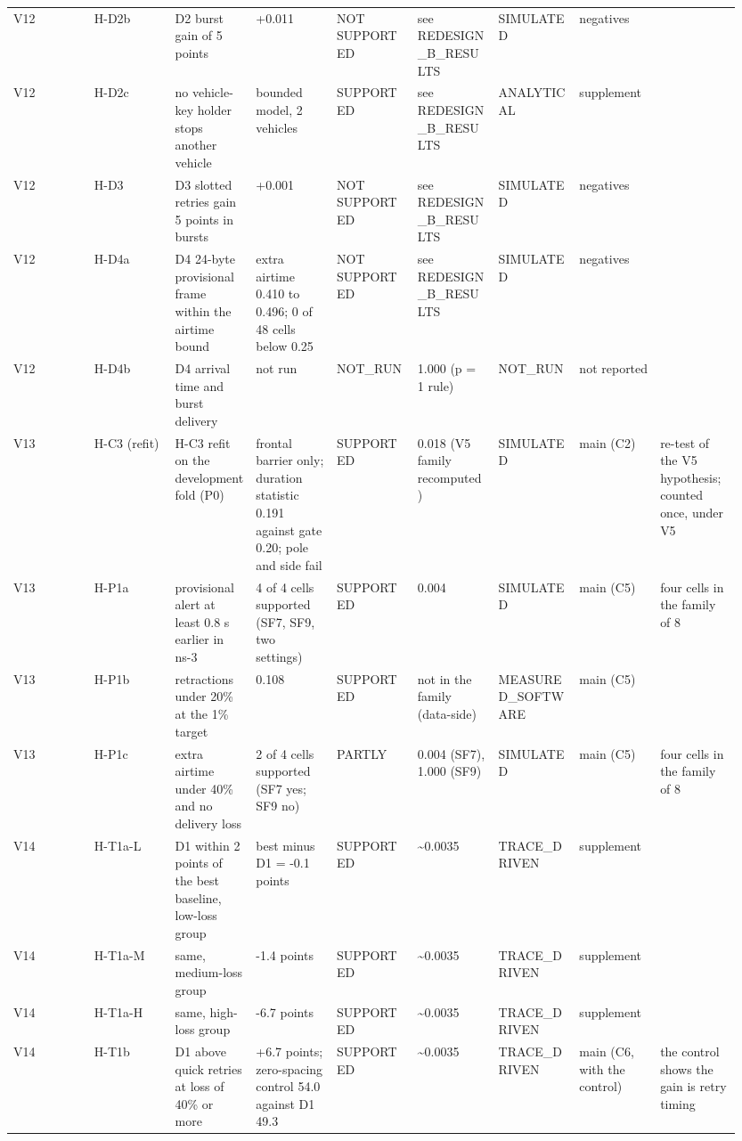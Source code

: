 {\begin{longtable}{p{0.106\linewidth}p{0.106\linewidth}p{0.106\linewidth}p{0.106\linewidth}p{0.106\linewidth}p{0.106\linewidth}p{0.106\linewidth}p{0.106\linewidth}p{0.106\linewidth}}
V12 & H-D2b & D2 burst gain of 5 points & +0.011 & NOT SUPPORTED & see REDESIGN\_B\_RESULTS & SIMULATED & negatives &  \\
V12 & H-D2c & no vehicle-key holder stops another vehicle & bounded model, 2 vehicles & SUPPORTED & see REDESIGN\_B\_RESULTS & ANALYTICAL & supplement &  \\
V12 & H-D3 & D3 slotted retries gain 5 points in bursts & +0.001 & NOT SUPPORTED & see REDESIGN\_B\_RESULTS & SIMULATED & negatives &  \\
V12 & H-D4a & D4 24-byte provisional frame within the airtime bound & extra airtime 0.410 to 0.496; 0 of 48 cells below 0.25 & NOT SUPPORTED & see REDESIGN\_B\_RESULTS & SIMULATED & negatives &  \\
V12 & H-D4b & D4 arrival time and burst delivery & not run & NOT\_RUN & 1.000 (p = 1 rule) & NOT\_RUN & not reported &  \\
V13 & H-C3 (refit) & H-C3 refit on the development fold (P0) & frontal barrier only; duration statistic 0.191 against gate 0.20; pole and side fail & SUPPORTED & 0.018 (V5 family recomputed) & SIMULATED & main (C2) & re-test of the V5 hypothesis; counted once, under V5 \\
V13 & H-P1a & provisional alert at least 0.8 s earlier in ns-3 & 4 of 4 cells supported (SF7, SF9, two settings) & SUPPORTED & 0.004 & SIMULATED & main (C5) & four cells in the family of 8 \\
V13 & H-P1b & retractions under 20\% at the 1\% target & 0.108 & SUPPORTED & not in the family (data-side) & MEASURED\_SOFTWARE & main (C5) &  \\
V13 & H-P1c & extra airtime under 40\% and no delivery loss & 2 of 4 cells supported (SF7 yes; SF9 no) & PARTLY & 0.004 (SF7), 1.000 (SF9) & SIMULATED & main (C5) & four cells in the family of 8 \\
V14 & H-T1a-L & D1 within 2 points of the best baseline, low-loss group & best minus D1 = -0.1 points & SUPPORTED & \textasciitilde{}0.0035 & TRACE\_DRIVEN & supplement &  \\
V14 & H-T1a-M & same, medium-loss group & -1.4 points & SUPPORTED & \textasciitilde{}0.0035 & TRACE\_DRIVEN & supplement &  \\
V14 & H-T1a-H & same, high-loss group & -6.7 points & SUPPORTED & \textasciitilde{}0.0035 & TRACE\_DRIVEN & supplement &  \\
V14 & H-T1b & D1 above quick retries at loss of 40\% or more & +6.7 points; zero-spacing control 54.0 against D1 49.3 & SUPPORTED & \textasciitilde{}0.0035 & TRACE\_DRIVEN & main (C6, with the control) & the control shows the gain is retry timing \\

\end{longtable}}
